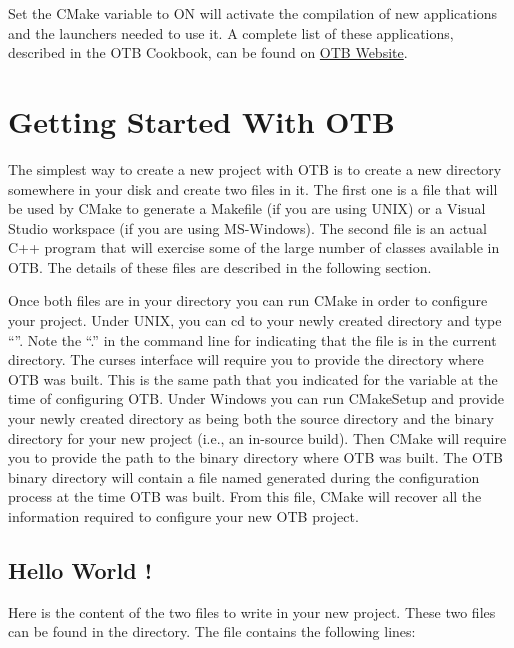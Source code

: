 Set the CMake variable  to ON will activate the compilation of new applications and the launchers needed to use it. A complete list of these applications, described in the OTB Cookbook, can be found on \href{http://orfeo-toolbox.org/Applications/index.html}{OTB Website}. 



\section{Getting Started With OTB }
\label{sec:GettingStartedWithOTB}

The simplest way to create a new project with OTB is to create a new directory
somewhere in your disk and create two files in it. The first one is a
 file that will be used by CMake to generate a Makefile
(if you are using UNIX) or a Visual Studio workspace (if you are using
MS-Windows).  The second file is an actual C++ program that will exercise
some of the large number of classes available in OTB. The details of these files
are described in the following section.

Once both files are in your directory you can run CMake in order to configure
your project. Under UNIX, you can cd to your newly created directory
and type ``''. Note the ``.'' in the command line for indicating
that the  file is in the current directory. The
curses interface will require you to provide the directory where OTB
was built. This is the same path that you indicated for the
 variable at the time of configuring OTB. Under
Windows you can run CMakeSetup and provide your newly created
directory as being both the source directory and the binary directory for
your new project (i.e., an in-source build). Then CMake will require you to
provide the path to the binary directory where OTB was built. The OTB binary
directory will contain a file named  generated during the
configuration process at the time OTB was built.  From this file, CMake will
recover all the information required to configure your new OTB project.


\subsection{Hello World !}
\label{sec:HelloWorldOTB}


Here is the content of the two files to write in your new project. These two
files can be found in the  directory. The
 file contains the following lines:

